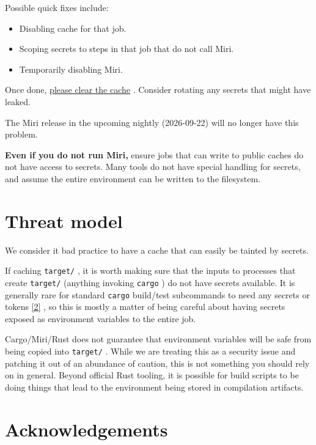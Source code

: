 \documentclass[11pt,a4paper]{article}
\begin{document}
Possible quick fixes include:

\begin{itemize}
\item Disabling cache for that job.
\item Scoping secrets to steps in that job that do not call Miri.
\item Temporarily disabling Miri.
\end{itemize}

Once done, \href{https://docs.github.com/en/actions/how-tos/manage-workflow-runs/manage-caches\#deleting-cache-entries}{please clear the cache} . Consider rotating any secrets that might have leaked.

The Miri release in the upcoming nightly (2026-09-22) will no longer have this problem.

\textbf{Even if you do not run Miri,} ensure jobs that can write to public caches do not have access to secrets. Many tools do not have special handling for secrets, and assume the entire environment can be written to the filesystem.

\section{Threat model}

We consider it bad practice to have a cache that can easily be tainted by secrets.

If caching \texttt{target/} , it is worth making sure that the inputs to processes that create \texttt{target/} (anything invoking \texttt{cargo} ) do not have secrets available. It is generally rare for standard \texttt{cargo} build/test subcommands to need any secrets or tokens \href{https://blog.rust-lang.org/2026/09/21/github-actions-leaking-secrets-when-miri-output-is-cached/\#fn-2}{[2]} , so this is mostly a matter of being careful about having secrets exposed as environment variables to the entire job.

Cargo/Miri/Rust does not guarantee that environment variables will be safe from being copied into \texttt{target/} . While we are treating this as a security issue and patching it out of an abundance of caution, this is not something you should rely on in general. Beyond official Rust tooling, it is possible for build scripts to be doing things that lead to the environment being stored in compilation artifacts.

\section{Acknowledgements}
\end{document}
